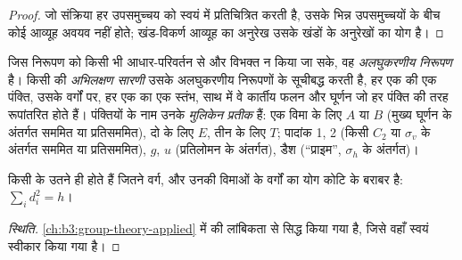\begin{proof}
जो संक्रिया हर उपसमुच्चय को स्वयं में प्रतिचित्रित करती है, उसके भिन्न उपसमुच्चयों
के बीच कोई आव्यूह अवयव नहीं होते; खंड-विकर्ण आव्यूह का अनुरेख उसके खंडों के
अनुरेखों का योग है।
\end{proof}

\begin{definition}\label{def:b3:point-groups:irrep}
जिस निरूपण को किसी भी आधार-परिवर्तन से और विभक्त न किया जा सके, वह
\emph{अलघुकरणीय निरूपण} है। किसी  की
\emph{अभिलक्षण सारणी} उसके अलघुकरणीय निरूपणों के
 सूचीबद्ध करती है, हर एक की एक पंक्ति, उसके वर्गों पर,
हर एक का एक स्तंभ, साथ में वे कार्तीय फलन और घूर्णन जो हर पंक्ति की तरह
रूपांतरित होते हैं। पंक्तियों के नाम उनके \emph{मुलिकेन
प्रतीक} हैं: एक विमा के लिए $A$ या $B$ (मुख्य घूर्णन के अंतर्गत
सममित या प्रतिसममित), दो के लिए $E$, तीन के लिए $T$;
पादांक 1, 2 (किसी $C_2$ या $\sigma_v$ के अंतर्गत सममित या प्रतिसममित), $g$, $u$
(प्रतिलोमन के अंतर्गत), डैश (``प्राइम'', $\sigma_h$ के अंतर्गत)।
\end{definition}

\begin{proposition}[अभिलक्षण सारणी का आकार]\label{prop:b3:point-groups:irrep-count}
किसी  के उतने ही  होते हैं जितने वर्ग, और
उनकी विमाओं के वर्गों का योग कोटि के बराबर है: $\sum_id_i^2 = h$।
\end{proposition}
\begin{proof}[स्थिति]
\cref{ch:b3:group-theory-applied} में  की लांबिकता से सिद्ध किया गया है,
जिसे वहाँ स्वयं स्वीकार किया गया है।
\end{proof}

